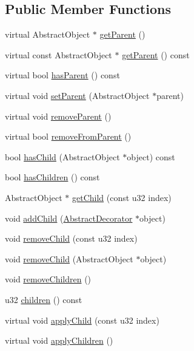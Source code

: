 \subsection*{Public Member Functions}
\begin{DoxyCompactItemize}
\item 
virtual Abstract\+Object $\ast$ \hyperlink{classjli_1_1_abstract_decorator_a0ba7425ec7436a0966f59aff7b24128a}{get\+Parent} ()
\item 
virtual const Abstract\+Object $\ast$ \hyperlink{classjli_1_1_abstract_decorator_a8761e3ec7b2e863e79c32fb915ef7d36}{get\+Parent} () const 
\item 
virtual bool \hyperlink{classjli_1_1_abstract_decorator_aa5a36a86cb742af47e66753325efd421}{has\+Parent} () const 
\item 
virtual void \hyperlink{classjli_1_1_abstract_decorator_a42ea84fb131a418e27656e64894f6d01}{set\+Parent} (Abstract\+Object $\ast$parent)
\item 
virtual void \hyperlink{classjli_1_1_abstract_decorator_a5f17849e3385c44e763b5c8be2af8f61}{remove\+Parent} ()
\item 
virtual bool \hyperlink{classjli_1_1_abstract_decorator_aa7b644ed3305abddf47bca8f1c27a1c7}{remove\+From\+Parent} ()
\item 
bool \hyperlink{classjli_1_1_abstract_decorator_afae2d7b945957466c8123b0997b83530}{has\+Child} (Abstract\+Object $\ast$object) const 
\item 
bool \hyperlink{classjli_1_1_abstract_decorator_af4b39d97a16de8808d95dc00930f89b9}{has\+Children} () const 
\item 
Abstract\+Object $\ast$ \hyperlink{classjli_1_1_abstract_decorator_a10f217076c21bfabb116628cdbd293b8}{get\+Child} (const u32 index)
\item 
void \hyperlink{classjli_1_1_abstract_decorator_a66dfdf726ea31f4f4c339941a04fc295}{add\+Child} (\hyperlink{classjli_1_1_abstract_decorator}{Abstract\+Decorator} $\ast$object)
\item 
void \hyperlink{classjli_1_1_abstract_decorator_a6df2bde7c572134fc50297e573f20ed5}{remove\+Child} (const u32 index)
\item 
void \hyperlink{classjli_1_1_abstract_decorator_a602e0659d157bc5cb34a9e6a66a82e2d}{remove\+Child} (Abstract\+Object $\ast$object)
\item 
void \hyperlink{classjli_1_1_abstract_decorator_a5f7a233c26d3be04e3689f80d19966be}{remove\+Children} ()
\item 
u32 \hyperlink{classjli_1_1_abstract_decorator_a47bc4f6fefc938003c202166bb9aac04}{children} () const 
\item 
virtual void \hyperlink{classjli_1_1_abstract_decorator_acf5f0b219e27683d92e231ae4616bacd}{apply\+Child} (const u32 index)
\item 
virtual void \hyperlink{classjli_1_1_abstract_decorator_ac341041f1c0b44492bb3331f69a0c1f0}{apply\+Children} ()
\end{DoxyCompactItemize}

